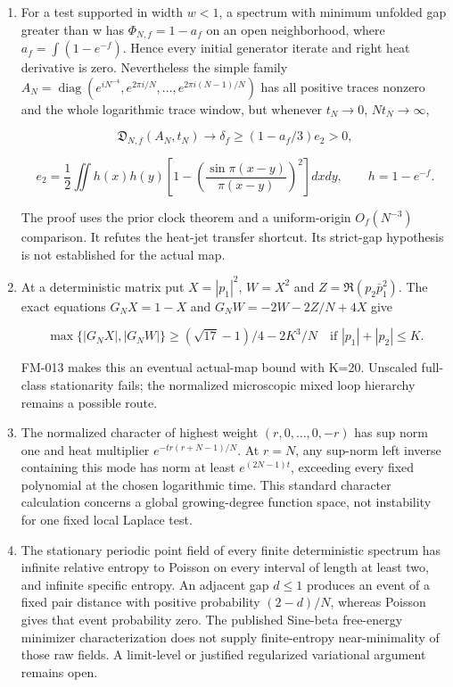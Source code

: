 \begin{enumerate}
\def\labelenumi{\arabic{enumi}.}
\item
  For a test supported in width \(w<1\), a spectrum with minimum unfolded
  gap greater than w has \(\Phi_{N,f}=1-a_f\) on an open neighborhood,
  where \(a_f=\int(1-e^{-f})\). Hence every initial generator iterate and
  right heat derivative is zero. Nevertheless the simple family
  \(A_N=\operatorname{diag}(e^{iN^{-4}},e^{2\pi i/N},\ldots, e^{2\pi i(N-1)/N})\) has all positive traces nonzero and the whole
  logarithmic trace window, but whenever \(t_N\to0\), \(Nt_N\to\infty\),

  \[
  \mathfrak D_{N,f}(A_N,t_N)\to\delta_f
  \ge(1-a_f/3)e_2>0,
  \]

  \[
  e_2=\frac12\iint h(x)h(y)
  \left[1-\left(\frac{\sin\pi(x-y)}{\pi(x-y)}\right)^2\right]dxdy,
  \qquad h=1-e^{-f}.
  \]

  The proof uses the prior clock theorem and a uniform-origin
  \(O_f(N^{-3})\) comparison. It refutes the heat-jet transfer shortcut.
  Its strict-gap hypothesis is not established for the actual map.
\item
  At a deterministic matrix put \(X=|p_1|^2\), \(W=X^2\) and
  \(Z=\Re(p_2\bar p_1^2)\). The exact equations
  \(G_NX=1-X\) and \(G_NW=-2W-2Z/N+4X\) give

  \[
  \max\{|G_NX|,|G_NW|\}\ge(\sqrt{17}-1)/4-2K^3/N
  \quad\text{if } |p_1|+|p_2|\le K.
  \]

  FM-013 makes this an eventual actual-map bound with K=20.
  Unscaled full-class stationarity fails; the normalized microscopic
  mixed loop hierarchy remains a possible route.
\item
  The normalized character of highest weight \((r,0,\ldots,0,-r)\)
  has sup norm one and heat multiplier
  \(e^{-tr(r+N-1)/N}\). At \(r=N\), any sup-norm left inverse containing
  this mode has norm at least \(e^{(2N-1)t}\), exceeding every fixed
  polynomial at the chosen logarithmic time. This standard character
  calculation concerns a global growing-degree function space,
  not instability for one fixed local Laplace test.
\item
  The stationary periodic point field of every finite deterministic
  spectrum has infinite relative entropy to Poisson on every interval
  of length at least two, and infinite specific entropy. An adjacent
  gap \(d\le1\) produces an event of a fixed pair distance with positive
  probability \((2-d)/N\), whereas Poisson gives that event probability zero.
  The published Sine-beta free-energy minimizer characterization does
  not supply finite-entropy near-minimality of those raw fields.
  A limit-level or justified regularized variational argument remains open.
\end{enumerate}

